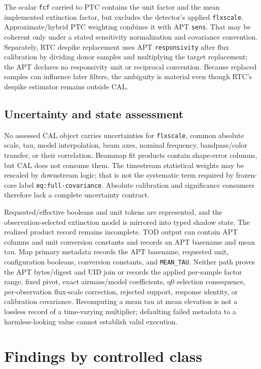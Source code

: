 \documentclass[11pt]{article}
\newcommand{\code}[1]{\nolinkurl{#1}}
\begin{document}
The scalar \code{fcf} carried to PTC contains the unit factor and the mean
implemented extinction factor, but excludes the detector's applied
\code{flxscale}.  Approximate/hybrid PTC weighting combines it with APT
\code{sens}.  That may be coherent only under a stated sensitivity
normalization and covariance convention.  Separately, RTC despike replacement
uses APT \code{responsivity} after flux calibration by dividing donor samples
and multiplying the target replacement; the APT declares no responsivity unit
or reciprocal convention.  Because replaced samples can influence later
filters, the ambiguity is material even though RTC's despike estimator remains
outside CAL.

\subsection{Uncertainty and state assessment}

No assessed CAL object carries uncertainties for \code{flxscale}, common
absolute scale, tau, model interpolation, beam axes, nominal frequency,
bandpass/color transfer, or their correlation.  Beammap fit products contain
shape-error columns, but CAL does not consume them.  The timestream statistical
weights may be rescaled by downstream logic; that is not the systematic term
required by frozen-core label \code{eq:full-covariance}.  Absolute
calibration and significance consumers therefore lack a complete uncertainty
contract.

Requested/effective booleans and unit tokens are represented, and the
observation-selected extinction model is mirrored into typed shadow state.
The realized product record remains incomplete.  TOD output can contain APT
columns and unit conversion constants and records an APT basename and mean
tau.  Map primary metadata records the APT basename, requested unit,
configuration booleans, conversion constants, and \code{MEAN_TAU}.  Neither
path proves the APT bytes/digest and UID join or records the applied
per-sample factor range, fixed pivot, exact airmass/model coefficients, q0
selection consequence, per-observation flux-scale correction, rejected
support, response identity, or calibration covariance.  Recomputing a mean
tau at mean elevation is not a lossless record of a time-varying multiplier;
defaulting failed metadata to a harmless-looking value cannot establish
valid execution.

\section{Findings by controlled class}
\end{document}
